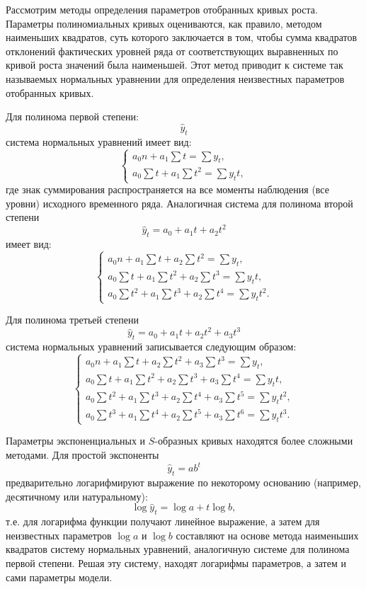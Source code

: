 Рассмотрим методы определения параметров отобранных кривых роста. Параметры полиномиальных кривых оцениваются, как правило, методом наименьших квадратов, суть которого заключается в том, чтобы сумма квадратов отклонений фактических уровней ряда от соответствующих выравненных по кривой роста значений была наименьшей. Этот метод приводит к системе так называемых нормальных уравнении для определения неизвестных параметров отобранных кривых.

Для полинома первой степени:
\[ \hat{y}_t \]
система нормальных уравнений имеет вид:
\[ 
	\left\{
			\begin{array}{ll}
										a_0n + a_1\sum t = \sum y_t,  \\ 
										a_0\sum t + a_1\sum t^2 = \sum y_tt, 
			\end{array} \right. \]
где знак суммирования распространяется на все моменты наблюдения (все уровни) исходного временного ряда. Аналогичная система для полинома второй степени
\[ \hat{y}_t = a_0 + a_1t +a_2t^2  \]
имеет вид:
\[ 
	\left\{
		\begin{array}{ll}
				a_0n + a_1\sum t +a_2 \sum t^2 = \sum y_t, \\ 
				a_0\sum t + a_1\sum t^2 + a_2 \sum t^3 = \sum y_tt, \\
				a_0 \sum t^2 + a_1\sum t^3 + a_2 \sum t^4 = \sum y_t t^2.
		\end{array} \right. 
\]

Для полинома третьей степени
\[ \hat{y}_t = a_0 + a_1t +a_2t^2 + a_3t^3 \]
система нормальных уравнений записывается следующим образом:
\[ 
	\left\{
		\begin{array}{ll}
			a_0n + a_1\sum t +a_2 \sum t^2 + a_3\sum t^3 = \sum y_t, \\ 
			a_0\sum t + a_1\sum t^2 + a_2 \sum t^3 + a_3\sum t^4= \sum y_tt, \\
			a_0 \sum t^2 + a_1\sum t^3 + a_2 \sum t^4 + a_3\sum t^5 = \sum y_t t^2, \\
			a_0 \sum t^3 + a_1\sum t^4 + a_2 \sum t^5 + a_3\sum t^6= \sum y_t t^3.
		\end{array}\right. 
\]

Параметры экспоненциальных и $S$-образных кривых находятся более сложными методами. Для простой экспоненты
\[ \hat{y}_t = ab^t \]
предварительно логарифмируют выражение по некоторому основанию (например, десятичному или натуральному):
\[ \log \hat{y}_t = \log a + t \log b, \]
т.е. для логарифма функции получают линейное выражение, а затем для неизвестных параметров $\log a$ и $\log b$ составляют на основе метода наименьших квадратов систему нормальных уравнений, аналогичную системе для полинома первой степени. Решая эту систему, находят логарифмы параметров, а затем и сами параметры модели.

